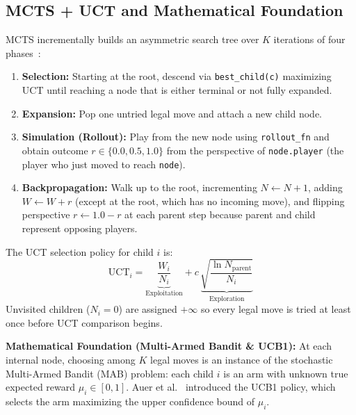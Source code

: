 \documentclass[conference]{IEEEtran}
\begin{document}
\subsection{MCTS + UCT and Mathematical Foundation}
MCTS incrementally builds an asymmetric search tree over $K$ iterations of four phases~\cite{coulom2006,kocsis2006}:
\begin{enumerate}
    \item \textbf{Selection:} Starting at the root, descend via \texttt{best\_child(c)} maximizing UCT until reaching a node that is either terminal or not fully expanded.
    \item \textbf{Expansion:} Pop one untried legal move and attach a new child node.
    \item \textbf{Simulation (Rollout):} Play from the new node using \texttt{rollout\_fn} and obtain outcome $r \in \{0.0, 0.5, 1.0\}$ from the perspective of \texttt{node.player} (the player who just moved to reach \texttt{node}).
    \item \textbf{Backpropagation:} Walk up to the root, incrementing $N \leftarrow N + 1$, adding $W \leftarrow W + r$ (except at the root, which has no incoming move), and flipping perspective $r \leftarrow 1.0 - r$ at each parent step because parent and child represent opposing players.
\end{enumerate}

The UCT selection policy for child $i$ is:
\begin{equation}
\text{UCT}_i = \underbrace{\frac{W_i}{N_i}}_{\text{Exploitation}} + c\,\underbrace{\sqrt{\frac{\ln N_{\mathrm{parent}}}{N_i}}}_{\text{Exploration}}
\label{eq:uct}
\end{equation}
Unvisited children ($N_i = 0$) are assigned $+\infty$ so every legal move is tried at least once before UCT comparison begins.

\textbf{Mathematical Foundation (Multi-Armed Bandit \& UCB1):} At each internal node, choosing among $K$ legal moves is an instance of the stochastic Multi-Armed Bandit (MAB) problem: each child $i$ is an arm with unknown true expected reward $\mu_i \in [0, 1]$. Auer et al.~\cite{auer2002} introduced the UCB1 policy, which selects the arm maximizing the upper confidence bound of $\mu_i$.
\end{document}
